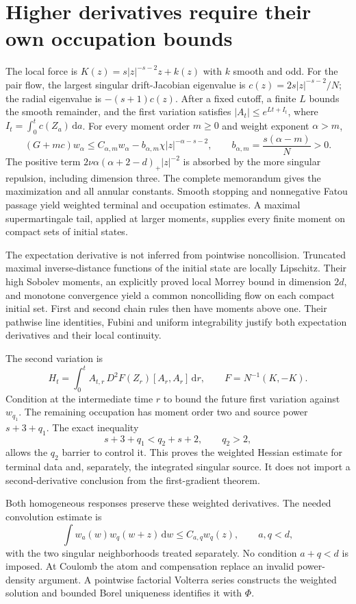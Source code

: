 \documentclass[10pt]{article}
\newcommand{\dd}{\,\mathrm d}
\begin{document}
\section*{Higher derivatives require their own occupation bounds}
The local force is $K(z)=s|z|^{-s-2}z+k(z)$ with $k$ smooth and odd. For the
pair flow, the largest singular drift-Jacobian eigenvalue is
$c(z)=2s|z|^{-s-2}/N$; the radial eigenvalue is $-(s+1)c(z)$.
After a fixed cutoff, a finite $L$ bounds the smooth remainder, and the first
variation satisfies $|A_t|\le e^{Lt+I_t}$, where $I_t=\int_0^tc(Z_a)\dd a$.
For every moment order $m\ge0$ and weight exponent $\alpha>m$,
\[
 (G+mc)w_\alpha\le C_{\alpha,m}w_\alpha
 -b_{\alpha,m}\chi|z|^{-\alpha-s-2},\qquad
 b_{\alpha,m}=\frac{s(\alpha-m)}N>0.
\]
The positive term $2\nu\alpha(\alpha+2-d)_+|z|^{-2}$ is absorbed by the more
singular repulsion, including dimension three. The complete memorandum gives
the maximization and all annular constants. Smooth stopping and nonnegative
Fatou passage yield weighted terminal and occupation estimates. A maximal
supermartingale tail, applied at larger moments, supplies every finite moment
on compact sets of initial states.

The expectation derivative is not inferred from pointwise noncollision.
Truncated maximal inverse-distance functions of the initial state are locally
Lipschitz. Their high Sobolev moments, an explicitly proved local Morrey bound
in dimension $2d$, and monotone convergence yield a common noncolliding flow on
each compact initial set. First and second chain rules then have moments above
one. Their pathwise line identities, Fubini and uniform integrability justify
both expectation derivatives and their local continuity.

The second variation is
\[
 H_t=\int_0^t A_{t,r}\,D^2F(Z_r)[A_r,A_r]\dd r,
 \qquad F=N^{-1}(K,-K).
\]
Condition at the intermediate time $r$ to bound the future first variation
against $w_{q_1}$. The remaining occupation has moment order two and source
power $s+3+q_1$. The exact inequality
\[
 s+3+q_1<q_2+s+2,\qquad q_2>2,
\]
allows the $q_2$ barrier to control it. This proves the weighted Hessian estimate
for terminal data and, separately, the integrated singular source. It does not
import a second-derivative conclusion from the first-gradient theorem.

Both homogeneous responses preserve these weighted derivatives. The needed
convolution estimate is
\[
 \int w_a(w)w_q(w+z)\dd w\le C_{a,q}w_q(z),\qquad a,q<d,
\]
with the two singular neighborhoods treated separately. No condition
$a+q<d$ is imposed. At Coulomb the atom and compensation replace an invalid
power-density argument. A pointwise factorial Volterra series constructs the
weighted solution and bounded Borel uniqueness identifies it with $\Phi$.
\end{document}
